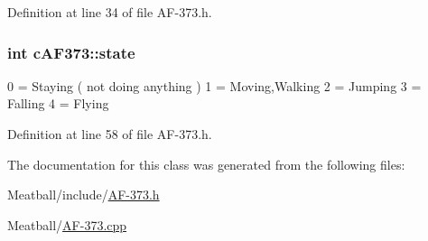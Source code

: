 Definition at line 34 of file A\-F-\/373.\-h.

\hypertarget{classc_a_f373_a32f080552487a891b9794bcce996091e}{
\subsubsection[{state}]{\setlength{\rightskip}{0pt plus 5cm}int c\-A\-F373\-::state}}\label{classc_a_f373_a32f080552487a891b9794bcce996091e}
0 = Staying ( not doing anything ) 1 = Moving,Walking 2 = Jumping 3 = Falling 4 = Flying 

Definition at line 58 of file A\-F-\/373.\-h.



The documentation for this class was generated from the following files\-:\begin{DoxyCompactItemize}
\item 
Meatball/include/\hyperlink{_a_f-373_8h}{A\-F-\/373.\-h}\item 
Meatball/\hyperlink{_a_f-373_8cpp}{A\-F-\/373.\-cpp}\end{DoxyCompactItemize}
